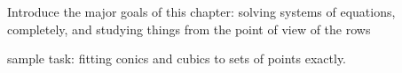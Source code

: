 \documentclass[elementsmain.tex]{subfiles}
\begin{document}
Introduce the major goals of this chapter: solving systems of equations, completely, and studying things from the point of view of the rows

sample task: fitting conics and cubics to sets of points exactly.


\clearpage
\end{document}
